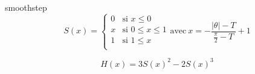 \documentclass{beamer}
\begin{document}
\begin{frame}[noframenumbering]{smoothstep}
\begin{equation}
\label{equationClamp}
S(x) = 
	\left\{
    \begin{array}{ll}
        0 & \mbox{si } x \leq 0 \\
		x & \mbox{si } 0 \leq x \leq 1 \\
        1 & \mbox{si } 1 \leq x \\
    \end{array}
\right.
\mathrm{avec} \  
x = - \frac{|\theta| - T}{\frac{\pi}{2}-T} + 1 
\end{equation}

\begin{equation}
\label{equationHermite}
H(x) = 3S(x)^2 - 2S(x)^3 
\end{equation}
\end{frame}
\end{document}
